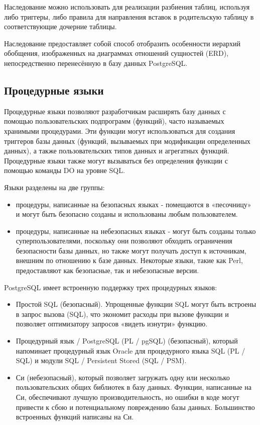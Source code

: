Наследование можно использовать для реализации разбиения таблиц, используя либо триггеры, либо правила для направления вставок в родительскую таблицу в соответствующие дочерние таблицы.


Наследование предоставляет собой способ отобразить особенности иерархий обобщения, изображенных на диаграммах отношений сущностей (ERD), непосредственно перенесённую в базу данных PostgreSQL.

\subsection{Процедурные языки}\label{sec:subs6}
Процедурные языки позволяют разработчикам расширять базу данных с помощью пользовательских подпрограмм (функций), часто называемых хранимыми процедурами. Эти функции могут использоваться для создания триггеров базы данных (функций, вызываемых при модификации определенных данных), а также пользовательских типов данных и агрегатных функций. Процедурные языки также могут вызываться без определения функции с помощью команды DO на уровне SQL.


Языки разделены на две группы: 
\begin{itemize}
  \item процедуры, написанные на безопасных языках - помещаются в «песочницу» и могут быть безопасно созданы и использованы любым пользователем.
  \item процедуры, написанные на небезопасных языках - могут быть созданы только суперпользователями, поскольку они позволяют обходить ограничения безопасности базы данных, но также могут получать доступ к источникам, внешним по отношению к базе данных. Некоторые языки, такие как Perl, предоставляют как безопасные, так и небезопасные версии.
\end{itemize}


PostgreSQL имеет встроенную поддержку трех процедурных языков:

\begin{itemize}
  \item Простой SQL (безопасный). Упрощенные функции SQL могут быть встроены в запрос вызова (SQL), что экономит расходы при вызове функции и позволяет оптимизатору запросов «видеть изнутри» функцию.
  \item Процедурный язык / PostgreSQL (PL / pgSQL) (безопасный), который напоминает процедурный язык Oracle для процедурного языка SQL (PL / SQL) и модули SQL / Persistent Stored (SQL / PSM).
  \item Си (небезопасный), который позволяет загружать одну или несколько пользовательских общих библиотек в базу данных. Функции, написанные на Си, обеспечивают лучшую производительность, но ошибки в коде могут привести к сбою и потенциальному повреждению базы данных. Большинство встроенных функций написаны на Си.
\end{itemize}


